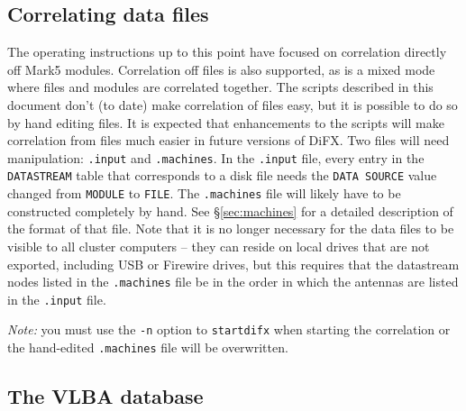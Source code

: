 \subsection{Correlating data files} \label{sec:datafiles}

The operating instructions up to this point have focused on correlation directly off Mark5 modules.
Correlation off files is also supported, as is a mixed mode where files and modules are correlated together.
The scripts described in this document don't (to date) make correlation of files easy, but it is possible to do so by hand editing files.
It is expected that enhancements to the scripts will make correlation from files much easier in future versions of DiFX.
Two files will need manipulation: {\tt .input} and {\tt .machines}.
In the {\tt .input} file, every entry in the {\tt DATASTREAM} table that corresponds to a disk file needs the {\tt DATA SOURCE} value changed from {\tt MODULE} to {\tt FILE}.
The {\tt .machines} file will likely have to be constructed completely by hand.
See \S\ref{sec:machines} for a detailed description of the format of that file.
Note that it is no longer necessary for the data files to be visible to all cluster computers -- they can reside on local drives that are not exported, including USB or Firewire drives, but this requires that the datastream nodes listed in the {\tt .machines} file be in the order in which the antennas are listed in the {\tt .input} file.

\noindent 
{\em Note:} you must use the {\tt -n} option to {\tt startdifx} when starting the correlation or the hand-edited {\tt .machines} file will be overwritten.


\subsection{The VLBA database}

